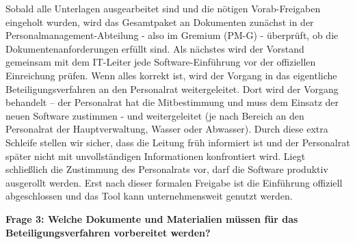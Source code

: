 \documentclass[
    12pt, 
    a4paper,
    ]{scrartcl} %
\begin{document}
Sobald alle Unterlagen ausgearbeitet sind und die nötigen Vorab-Freigaben eingeholt wurden, wird das Gesamtpaket an Dokumenten zunächst in der Personalmanagement-Abteilung - also im Gremium (PM-G) - überprüft, ob die Dokumentenanforderungen erfüllt sind. Als nächstes wird der Vorstand gemeinsam mit dem IT-Leiter jede Software-Einführung vor der offiziellen Einreichung prüfen. Wenn alles korrekt ist, wird der Vorgang in das eigentliche Beteiligungsverfahren an den Personalrat weitergeleitet. Dort wird der Vorgang behandelt – der Personalrat hat die Mitbestimmung und muss dem Einsatz der neuen Software zustimmen - und weitergeleitet (je nach Bereich an den Personalrat der Hauptverwaltung, Wasser oder Abwasser). Durch diese extra Schleife stellen wir sicher, dass die Leitung früh informiert ist und der Personalrat später nicht mit unvollständigen Informationen konfrontiert wird.  Liegt schließlich die Zustimmung des Personalrats vor, darf die Software produktiv ausgerollt werden. Erst nach dieser formalen Freigabe ist die Einführung offiziell abgeschlossen und das Tool kann unternehmensweit genutzt werden.

\textbf{Frage 3: Welche Dokumente und Materialien müssen für das Beteiligungsverfahren vorbereitet werden?}
\end{document}
